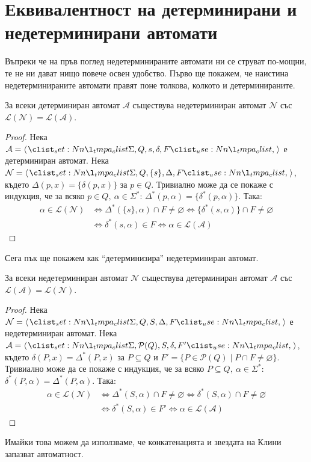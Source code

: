\section{Еквивалентност на детерминирани и недетерминирани автомати}

Въпреки че на пръв поглед недетерминираните автомати ни се струват по-мощни, те не ни дават нищо повече освен удобство.
Първо ще покажем, че наистина недетерминираните автомати правят поне толкова, колкото и детерминираните.

\begin{claim}
    За всеки детерминиран автомат $\mathcal{A}$ съществува недетерминиран автомат $\mathcal{N}$ със $\mathcal{L(N) = L(A)}$.
\end{claim}

\begin{proof}
    Нека $\mathcal{A} = \opair{\Sigma, Q, s, \delta, F}$ е детерминиран автомат.
    Нека $\mathcal{N} = \opair{\Sigma, Q, \{ s \}, \Delta, F}$,
    където $\Delta(p, x) = \{ \delta(p, x) \}$ за $p \in Q$.
    Тривиално може да се покаже с индукция, че за всяко $p \in Q, \: \alpha \in \Sigma^*$: $\Delta^*(p, \alpha) = \{ \delta^*(p, \alpha) \}$.
    Така:
    \begin{align*}
        \alpha \in \mathcal{L(N)} & \iff \Delta^*(\{ s \}, \alpha) \cap F \neq \varnothing \iff \{ \delta^*(s, \alpha) \} \cap F \neq \varnothing \\
                                  & \iff \delta^*(s, \alpha) \in F \iff \alpha \in \mathcal{L(A)}
    \end{align*}
\end{proof}

Сега пък ще покажем как ``детерминизира'' недетерминиран автомат.

\begin{claim}
    За всеки недетерминиран автомат $\mathcal{N}$ съществува детерминиран автомат $\mathcal{A}$ със $\mathcal{L(A) = L(N)}$.
\end{claim}

\begin{proof}
    Нека $\mathcal{N} = \opair{\Sigma, Q, S, \Delta, F}$ е недетерминиран автомат.
    Нека $\mathcal{A} = \opair{\Sigma, \mathcal{P}(Q), S, \delta, F'}$,
    където $\delta(P, x) = \Delta^*(P, x)$ за $P \subseteq Q$ и $F' = \{ P \in \mathcal{P}(Q) \mid P \cap F \neq \varnothing \}$.
    Тривиално може да се покаже с индукция, че за всяко $P \subseteq Q, \: \alpha \in \Sigma^*$: $\delta^*(P, \alpha) = \Delta^*(P, \alpha)$.
    Така:
    \begin{align*}
        \alpha \in \mathcal{L(N)} & \iff \Delta^*(S, \alpha) \cap F \neq \varnothing \iff \delta^*(S, \alpha) \cap F \neq \varnothing \\
                                  & \iff \delta^*(S, \alpha) \in F' \iff \alpha \in \mathcal{L(A)}
    \end{align*}
\end{proof}

Имайки това можем да използваме, че конкатенацията и звездата на Клини запазват автоматност.